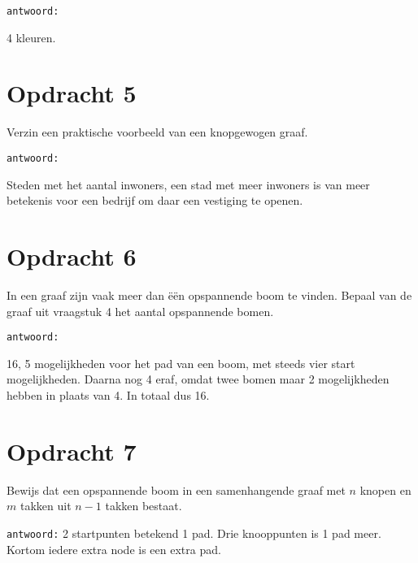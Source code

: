 \texttt{antwoord:}

4 kleuren.

\section{Opdracht 5}
Verzin een praktische voorbeeld van een knopgewogen graaf.

\texttt{antwoord:}

Steden met het aantal inwoners, een stad met meer inwoners is van meer betekenis voor een bedrijf om daar een vestiging te openen.

\section{Opdracht 6}
In een graaf zijn vaak meer dan \"{e}\"{e}n opspannende boom te vinden. Bepaal van de graaf uit vraagstuk 4 het aantal opspannende bomen.

\texttt{antwoord:}

16, 5 mogelijkheden voor het pad van een boom, met steeds vier start mogelijkheden. Daarna nog 4 eraf, omdat twee bomen maar 2 mogelijkheden hebben in plaats van 4. In totaal dus 16.

\section{Opdracht 7}
Bewijs dat een opspannende boom in een samenhangende graaf met $n$ knopen en $m$ takken uit $n-1$ takken bestaat.

\texttt{antwoord:}
2 startpunten betekend 1 pad. Drie knooppunten is 1 pad meer. Kortom iedere extra node is een extra pad.

